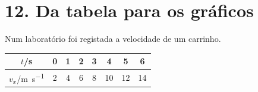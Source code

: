 \documentclass[11pt,a4paper]{article}
\begin{document}
	\section{12. Da tabela para os gráficos}
	
	Num laboratório foi registada a velocidade de um carrinho.
	
	\begin{center}
		
		\renewcommand{\arraystretch}{1.35}
		
		\begin{tabular}{c|ccccccc}
			
			\toprule
			
			$t$/s & 0 & 1 & 2 & 3 & 4 & 5 & 6\\
			
			\midrule
			
			$v_x$/\si{m.s^{-1}}
			&
			2 & 4 & 6 & 8 & 10 & 12 & 14
			
			\\
			
			\bottomrule
			
		\end{tabular}
		
	\end{center}
	
\end{document}
